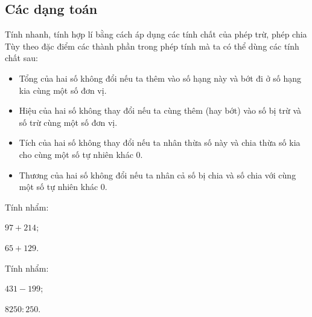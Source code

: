 \subsection{Các dạng toán}
\begin{dang}{Tính nhanh, tính hợp lí bằng cách áp dụng các tính chất của phép trừ, phép chia}
Tùy theo đặc điểm các thành phần trong phép tính mà ta có thể dùng các tính chất sau:
\begin{itemize}
	\item Tổng của hai số không đổi nếu ta thêm vào số hạng này và bớt đi ở số hạng kia cùng một số đơn vị.
	\item Hiệu của hai số không thay đổi nếu ta cùng thêm (hay bớt) vào số bị trừ và số trừ cùng một số đơn vị.
	\item Tích của hai số không thay đổi nếu ta nhân thừa số này và chia thừa số kia cho cùng một số tự nhiên khác $0$.
	\item Thương của hai số không đổi nếu ta nhân cả số bị chia và số chia với cùng một số tự nhiên khác $0$.
\end{itemize}
\end{dang}
\begin{vd}%
Tính nhẩm:
\begin{enumEX}{2}
	\item $97 + 214$;
	\item $65 + 129$.
\end{enumEX}
\end{vd}
\begin{vd}%
Tính nhẩm:
\begin{enumEX}{2}
	\item $431 - 199$;
	\item $8250 : 250$.
\end{enumEX}
\end{vd}

